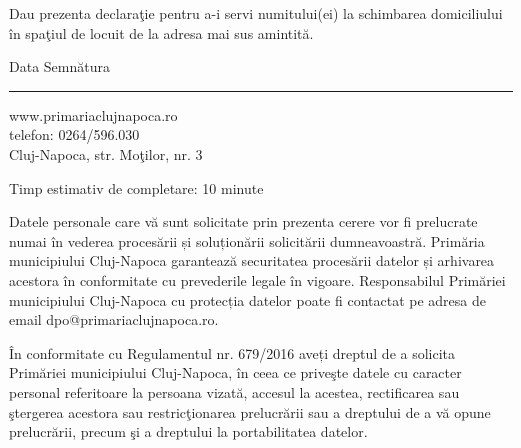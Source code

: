 \documentclass[11pt,a4paper]{article}
\newcommand{\fillline}[1][6cm]{\underline{\hspace{#1}}}
\begin{document}
\vspace{0.3cm}

Dau prezenta declaraţie pentru a-i servi numitului(ei) \fillline[8cm] la schimbarea domiciliului în spaţiul de locuit de la adresa mai sus amintită.

\vspace{2cm}

Data \fillline[4cm] \hfill Semnătura \fillline[5cm]

\vfill

\hrule
\vspace{0.2cm}
\footnotesize
www.primariaclujnapoca.ro\\
telefon: 0264/596.030\\
Cluj-Napoca, str. Moţilor, nr. 3

\vspace{0.3cm}

Timp estimativ de completare: 10 minute

Datele personale care vă sunt solicitate prin prezenta cerere vor fi prelucrate numai în vederea procesării și soluționării solicitării dumneavoastră. Primăria municipiului Cluj-Napoca garantează securitatea procesării datelor și arhivarea acestora în conformitate cu prevederile legale în vigoare. Responsabilul Primăriei municipiului Cluj-Napoca cu protecția datelor poate fi contactat pe adresa de email dpo@primariaclujnapoca.ro.

În conformitate cu Regulamentul nr. 679/2016 aveți dreptul de a solicita Primăriei municipiului Cluj-Napoca, în ceea ce priveşte datele cu caracter personal referitoare la persoana vizată, accesul la acestea, rectificarea sau ştergerea acestora sau restricţionarea prelucrării sau a dreptului de a vă opune prelucrării, precum şi a dreptului la portabilitatea datelor.
\end{document}
